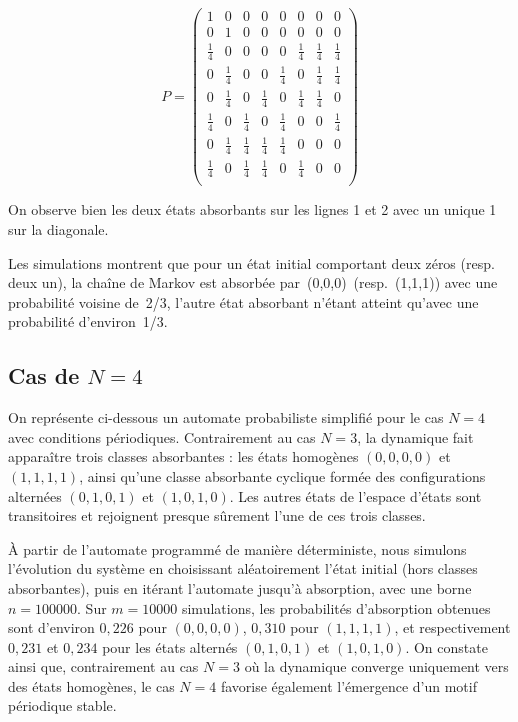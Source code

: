 \documentclass[11pt,a4paper]{article}
\begin{document}
\[
P =
\begin{pmatrix}
1 & 0 & 0 & 0 & 0 & 0 & 0 & 0\\
0 & 1 & 0 & 0 & 0 & 0 & 0 & 0 \\
\frac 14 & 0 & 0 & 0 & 0 & \frac 14 & \frac 14 & \frac 14 \\
0 & \frac 14 & 0 & 0 & \frac 14 & 0 & \frac 14 & \frac 14 \\
0 & \frac 14 & 0 & \frac 14 & 0 & \frac 14 & \frac 14 & 0 \\
\frac 14 & 0 & \frac 14 & 0 & \frac 14 & 0 & 0 & \frac 14 \\
0 & \frac 14 & \frac 14 & \frac 14 & \frac 14 & 0 & 0 & 0 \\
\frac 14 & 0 & \frac 14 & \frac 14 & 0 & \frac 14 & 0 & 0 \\
\end{pmatrix}
\]

On observe bien les deux états absorbants sur les lignes 1 et 2 avec un unique 1 sur la diagonale.

Les simulations montrent que pour un état initial comportant deux
zéros (resp. deux un), la chaîne de Markov est absorbée
par (0,0,0) (resp. (1,1,1)) avec une probabilité voisine de 2/3,
l’autre état absorbant n’étant atteint qu’avec une probabilité
d’environ 1/3.


\subsection{Cas de $N = 4$}

On représente ci-dessous un automate probabiliste simplifié pour le
cas $N = 4$ avec conditions périodiques.  Contrairement au cas $N =
3$, la dynamique fait apparaître trois classes absorbantes : les états
homogènes $(0,0,0,0)$ et $(1,1,1,1)$, ainsi qu’une classe
absorbante cyclique formée des configurations alternées $(0,1,0,1)$ et
$(1,0,1,0)$.  Les autres états de l’espace d’états sont transitoires
et rejoignent presque sûrement l’une de ces trois classes.

À partir de l’automate programmé de manière déterministe, nous
simulons l’évolution du système en choisissant aléatoirement l’état
initial (hors classes absorbantes), puis en itérant l’automate jusqu’à
absorption, avec une borne $n = 100000$.  Sur $m = 10000$ simulations,
les probabilités d’absorption obtenues sont d’environ $0{,}226$ pour
$(0,0,0,0)$, $0{,}310$ pour $(1,1,1,1)$, et respectivement $0{,}231$
et $0{,}234$ pour les états alternés $(0,1,0,1)$ et $(1,0,1,0)$.  On
constate ainsi que, contrairement au cas $N = 3$ où la dynamique
converge uniquement vers des états homogènes, le cas $N = 4$ favorise
également l’émergence d’un motif périodique stable.
\end{document}
